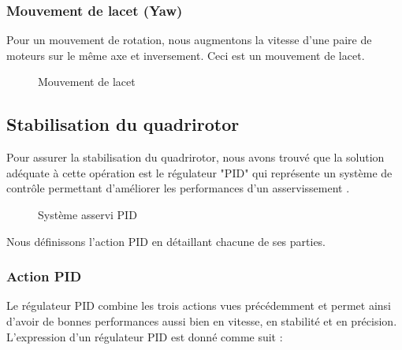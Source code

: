 \subsubsection{Mouvement de lacet (Yaw)}
Pour un mouvement de rotation, nous augmentons la vitesse d'une paire de moteurs sur le même axe et inversement. Ceci est un mouvement de lacet.
\begin{figure} [H]
\begin{center}
\end{center}
\caption{Mouvement de lacet}	
\end{figure}
\subsection {Stabilisation du quadrirotor}
Pour assurer la stabilisation du quadrirotor, nous avons trouvé que la solution adéquate à cette opération est le régulateur "PID" qui représente un système de contrôle permettant d’améliorer les performances d'un asservissement \cite{Wikipideab}.
\begin{figure}[H] 
\begin{center}
	\centering
\end{center}
\caption{Système asservi PID}
\end{figure}

Nous définissons l'action PID en détaillant chacune de ses parties.
\subsubsection {Action PID} 
Le régulateur PID combine les trois actions vues précédemment et permet ainsi d'avoir de bonnes performances aussi bien en vitesse, en stabilité et en précision. L'expression d’un régulateur PID \cite{WikiMemoiresa} est donné comme suit :

